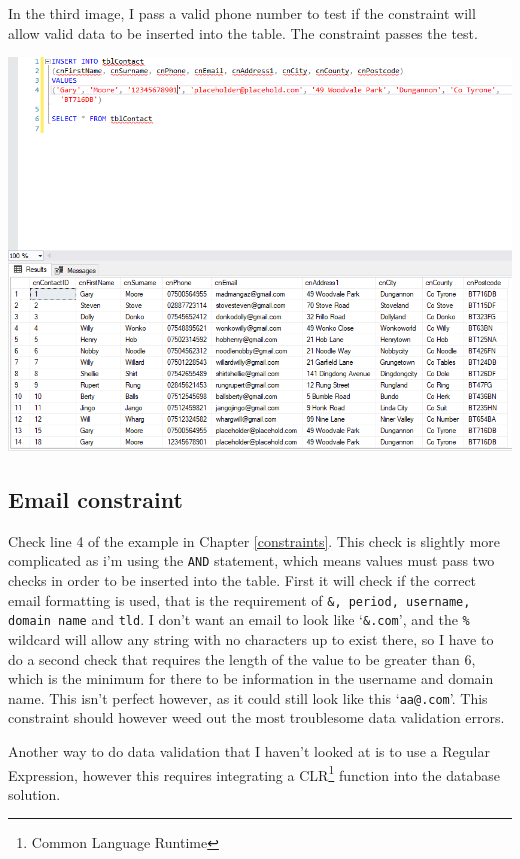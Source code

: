 \documentclass[11pt,a4paper]{scrartcl}
\begin{document}
	In the third image, I pass a valid phone number to test if the constraint will allow valid data to be inserted into the table. The constraint passes the test.
	
	\begin{center}
		\includegraphics[width=0.9\linewidth]{images/PhoneConstraintTest3}
	\end{center}
	
	\subsection{Email constraint}\label{emailconstraint}
	
	Check line 4 of the example in Chapter \ref{constraints}. This check is slightly more complicated as i'm using the \texttt{AND} statement, which means values must pass two checks in order to be inserted into the table. First it will check if the correct email formatting is used, that is the requirement of \texttt{\&, period, username, domain name} and \texttt{tld}. I don't want an email to look like `\texttt{\&.com}', and the \texttt{\%} wildcard will allow any string with no characters up to exist there, so I have to do a second check that requires the length of the value to be greater than 6, which is the minimum for there to be information in the username and domain name. This isn't perfect however, as it could still look like this `\texttt{aa@.com}'. This constraint should however weed out the most troublesome data validation errors.
	
	Another way to do data validation that I haven't looked at is to use a Regular Expression, however this requires integrating a CLR\footnote{Common Language Runtime} function into the database solution.
	
\end{document}
